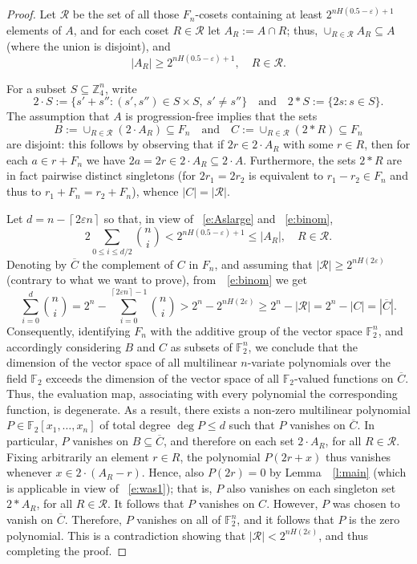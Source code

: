 \documentclass[12pt,reqno]{amsart}
\newcommand{\eps}{\varepsilon}
\newcommand{\F}{{\mathbb F}}
\newcommand{\Z}{{\mathbb Z}}
\newcommand{\oC}{{\overline C}}
\newcommand{\cR}{{\mathcal R}}
\newcommand{\lcl}{\left\lceil}
\newcommand{\rcl}{\right\rceil}
\newcommand{\<}{\langle}
\renewcommand{\>}{\rangle}
\newcommand{\seq}{\subseteq}
\newcommand{\longc}{,\ldots,}
\newcommand{\refl}[1]{~\ref{l:#1}}
\newcommand{\refe}[1]{~\eqref{e:#1}}
\theoremstyle{remark}
\begin{document}
\begin{proof}
Let $\cR$ be the set of all those $F_n$-cosets containing at least
$2^{nH(0.5-\eps)+1}$ elements of $A$, and for each coset $R\in\cR$ let
$A_R:=A\cap R$; thus, $\cup_{R\in\cR} A_R \seq A$ (where the union is
disjoint), and
\begin{equation}\label{e:Aslarge}
  |A_R| \ge 2^{nH(0.5-\eps)+1},\quad R\in\cR.
\end{equation}

For a subset $S\seq\Z_4^n$, write
  $$ 2\cdot S:=\{s'+s''\colon (s',s'')\in S\times S,\ s'\ne s'' \}
       \quad\text{and}\quad 2\ast S:=\{2s\colon s\in S \}. $$
The assumption that $A$ is progression-free implies that the sets
  $$ B := \cup_{R\in\cR}(2\cdot A_R)\seq F_n\quad\text{and}\quad
                                        C:=\cup_{R\in\cR}(2\ast R)\seq F_n $$
are disjoint: this follows by observing that if $2r\in 2\cdot A_R$ with some
$r\in R$, then for each $a\in r+F_n$ we have $2a=2r\in 2\cdot A_R\seq 2\cdot
A$. Furthermore, the sets $2\ast R$ are in fact pairwise distinct singletons
(for $2r_1=2r_2$ is equivalent to $r_1-r_2\in F_n$ and thus to
$r_1+F_n=r_2+F_n$), whence $|C|=|\cR|$.

Let $d=n-\lcl 2\eps n\rcl$ so that, in view of \refe{Aslarge} and
\refe{binom},
\begin{equation}\label{e:was1}
  2\sum_{0\le i\le d/2} \binom ni < 2^{nH(0.5-\eps)+1} \le |A_R|, \quad R\in\cR.
\end{equation}
Denoting by $\overline C$ the complement of $C$ in $F_n$, and assuming that
$|\cR|\ge 2^{nH(2\eps)}$ (contrary to what we want to prove),
from~\refe{binom} we get
  $$ \sum_{i=0}^d \binom ni = 2^n - \sum_{i=0}^{\lcl 2\eps n\rcl-1} \binom ni
      > 2^n - 2^{nH(2\eps)} \ge 2^n - |\cR| = 2^n - |C| = |\oC|. $$
Consequently, identifying $F_n$ with the additive group of the vector space
$\F_2^n$, and accordingly considering $B$ and $C$ as subsets of $\F_2^n$, we
conclude that the dimension of the vector space of all multilinear
$n$-variate polynomials over the field $\F_2$ exceeds the dimension of the
vector space of all $\F_2$-valued functions on $\oC$. Thus, the evaluation
map, associating with every polynomial the corresponding function, is
degenerate. As a result, there exists a non-zero multilinear polynomial
$P\in\F_2[x_1\longc x_n]$ of total degree $\deg P\le d$ such that $P$
vanishes on $\overline C$. In particular, $P$ vanishes on $B\seq\overline C$,
and therefore on each set $2\cdot A_R$, for all $R\in\cR$. Fixing arbitrarily
an element $r\in R$, the polynomial $P(2r+x)$ thus vanishes whenever $x\in
2\cdot(A_R-r)$. Hence, also $P(2r)=0$ by Lemma~\refl{main} (which is
applicable in view of \refe{was1}); that is, $P$ also vanishes on each
singleton set $2\ast A_R$, for all $R\in\cR$. It follows that $P$ vanishes on
$C$. However, $P$ was chosen to vanish on $\overline C$. Therefore, $P$
vanishes on all of $\F_2^n$, and it follows that $P$ is the zero polynomial.
This is a contradiction showing that $|\cR|<2^{nH(2\eps)}$, and thus
completing the proof.
\end{proof}
\end{document}
